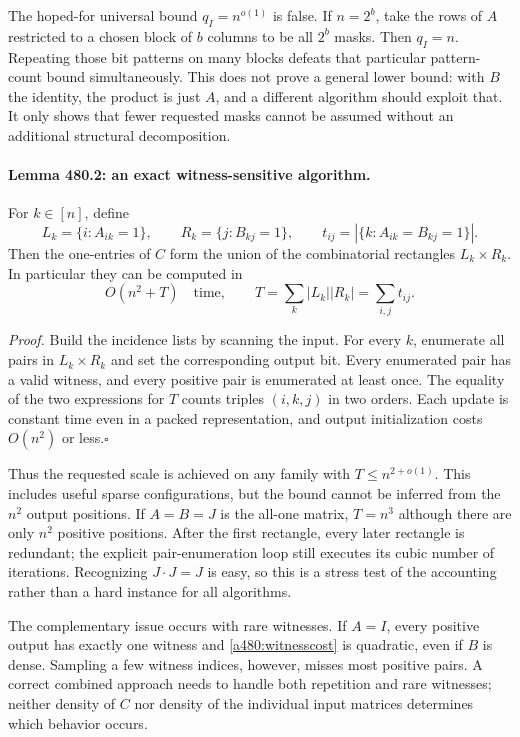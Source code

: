 \documentclass[11pt]{article}
\begin{document}
The hoped-for universal bound $q_I=n^{o(1)}$ is false. If $n=2^b$,
take the rows of $A$ restricted to a chosen block of $b$ columns to be
all $2^b$ masks. Then $q_I=n$. Repeating those bit patterns on many
blocks defeats that particular pattern-count bound simultaneously. This
does not prove a general lower bound: with $B$ the identity, the product
is just $A$, and a different algorithm should exploit that. It only shows
that fewer requested masks cannot be assumed without an additional
structural decomposition.

\paragraph{Lemma 480.2: an exact witness-sensitive algorithm.}
For $k\in[n]$, define
\[
 L_k=\{i:A_{ik}=1\},\qquad R_k=\{j:B_{kj}=1\},\qquad
 t_{ij}=|\{k:A_{ik}=B_{kj}=1\}|.
\]
Then the one-entries of $C$ form the union of the combinatorial rectangles
$L_k\times R_k$. In particular they can be computed in
\begin{equation}\label{a480:witnesscost}
 O(n^2+T)\quad\text{time},\qquad
 T=\sum_k|L_k||R_k|=\sum_{i,j}t_{ij}.
\end{equation}

\emph{Proof.} Build the incidence lists by scanning the input. For every
$k$, enumerate all pairs in $L_k\times R_k$ and set the corresponding
output bit. Every enumerated pair has a valid witness, and every positive
pair is enumerated at least once. The equality of the two expressions for
$T$ counts triples $(i,k,j)$ in two orders. Each update is constant time
even in a packed representation, and output initialization costs $O(n^2)$
or less.\hfill$\square$

Thus the requested scale is achieved on any family with
$T\leq n^{2+o(1)}$. This includes useful sparse configurations, but the
bound cannot be inferred from the $n^2$ output positions. If $A=B=J$
is the all-one matrix, $T=n^3$ although there are only $n^2$ positive
positions. After the first rectangle, every later rectangle is redundant;
the explicit pair-enumeration loop still executes its cubic number of
iterations. Recognizing $J\cdot J=J$ is easy, so this is a stress test
of the accounting rather than a hard instance for all algorithms.

The complementary issue occurs with rare witnesses. If $A=I$, every
positive output has exactly one witness and \eqref{a480:witnesscost} is
quadratic, even if $B$ is dense. Sampling a few witness indices, however,
misses most positive pairs. A correct combined approach needs to handle
both repetition and rare witnesses; neither density of $C$ nor density
of the individual input matrices determines which behavior occurs.
\end{document}
